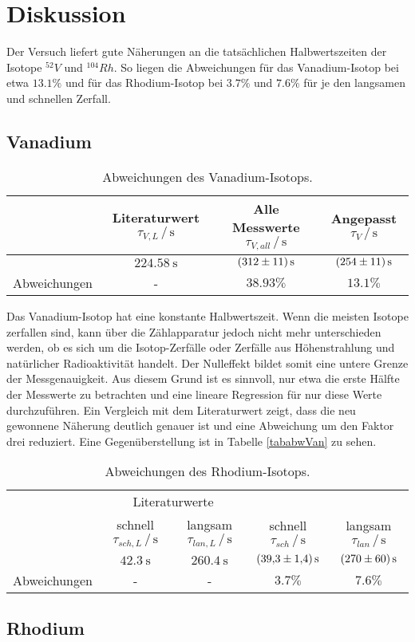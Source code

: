 \section{Diskussion}
\label{sec:Diskussion}

Der Versuch liefert gute Näherungen an die tatsächlichen Halbwertszeiten der Isotope $^{52}V$ und $^{104}Rh$.
So liegen die Abweichungen für das Vanadium-Isotop bei etwa $13.1\%$ und für das Rhodium-Isotop bei $3.7\%$ und $7.6\%$ für je den langsamen und schnellen Zerfall.

\subsection{Vanadium}

\begin{table}
    \centering
    \caption{Abweichungen des Vanadium-Isotops.}
    \label{tab:abwVan}
    \begin{tabular}{c c c c}
        \toprule
         & Literaturwert $\tau_{V,L}\,/\,\si{\second}$\cite{perTable} & Alle Messwerte $\tau_{V,all}\,/\,\si{\second}$ & Angepasst $\tau_{V}\,/\,\si{\second}$ \\
        \midrule
         & $\SI{224.58}{\second}$ & $\SI{312\pm11}{\second}$ & $\SI{254\pm11}{\second}$ \\
        Abweichungen & - & $38.93\%$ & $13.1\%$ \\
        \bottomrule
    \end{tabular}
\end{table}

Das Vanadium-Isotop hat eine konstante Halbwertszeit. Wenn die meisten Isotope zerfallen sind, kann über die Zählapparatur jedoch nicht mehr unterschieden werden,
ob es sich um die Isotop-Zerfälle oder Zerfälle aus Höhenstrahlung und natürlicher Radioaktivität handelt. Der Nulleffekt bildet somit eine untere Grenze der Messgenauigkeit.
Aus diesem Grund ist es sinnvoll, nur etwa die erste Hälfte der Messwerte zu betrachten und eine lineare Regression für nur diese Werte durchzuführen.
Ein Vergleich mit dem Literaturwert zeigt, dass die neu gewonnene Näherung deutlich genauer ist und eine Abweichung um den Faktor drei reduziert.
Eine Gegenüberstellung ist in Tabelle \ref{tababwVan} zu sehen.

\begin{table}
    \centering
    \caption{Abweichungen des Rhodium-Isotops.}
    \label{tab:abwVan}
    \begin{tabular}{c c c c c}
        \toprule
        & \multicolumn{2}{c}{Literaturwerte\cite{RhIsotopes}} & & \\
        & schnell $\tau_{sch, L}\,/\,\si{\second}$ & langsam $\tau_{lan, L}\,/\,\si{\second}$ & schnell $\tau_{sch}\,/\,\si{\second}$ & langsam $\tau_{lan}\,/\,\si{\second}$ \\
        \midrule
        & $\SI{42.3}{\second}$ & $\SI{260.4}{\second}$ & $\SI{39.3\pm1.4}{\second}$ & $\SI{270\pm60}{\second}$ \\
        Abweichungen & - & - & $3.7\%$ & $7.6\%$ \\
        \bottomrule
    \end{tabular}
\end{table}

\subsection{Rhodium}